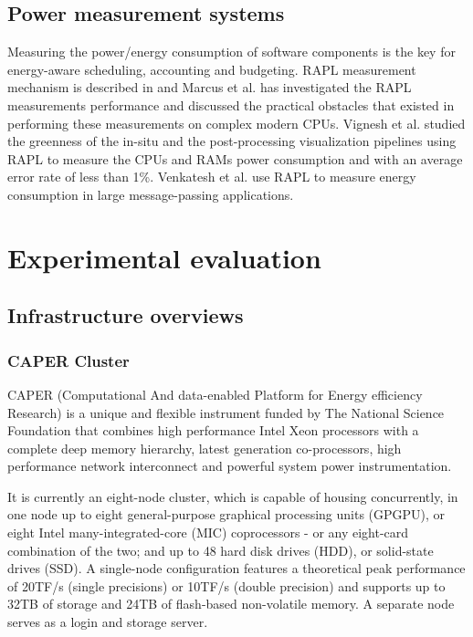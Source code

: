 \documentclass[10pt, conference, compsocconf]{IEEEtran}
\begin{document}
\subsection{Power measurement systems}
Measuring the power/energy consumption of software components is the key for energy-aware scheduling, accounting and budgeting. RAPL measurement mechanism is described in\cite{porterfield2015application} and Marcus et al.\cite{hahnel2012measuring} has investigated the RAPL measurements performance and discussed the practical obstacles that existed in performing these measurements on complex modern CPUs. Vignesh et al.\cite{adhinarayanan2015greenness} studied the greenness of the in-situ and the post-processing visualization pipelines using RAPL to measure the CPUs and RAMs power consumption and with an average error rate of less than 1\%. Venkatesh et al.\cite{venkatesh2013evaluation} use RAPL to measure energy consumption in large message-passing applications.


\section{Experimental evaluation}
\subsection{Infrastructure overviews}
\subsubsection{CAPER Cluster}
CAPER (Computational And data-enabled Platform for Energy efficiency Research) is a unique and flexible instrument funded by The National Science Foundation that combines high performance Intel Xeon processors with a complete deep memory hierarchy, latest generation co-processors, high performance network interconnect and powerful system power instrumentation.

It is currently an eight-node cluster, which is capable of housing concurrently, in one node up to eight general-purpose graphical processing units (GPGPU), or eight Intel many-integrated-core (MIC) coprocessors - or any eight-card combination of the two; and up to 48 hard disk drives (HDD), or solid-state drives (SSD). A single-node configuration features a theoretical peak performance of 20TF/s (single precisions) or 10TF/s (double precision) and supports up to 32TB of storage and 24TB of flash-based non-volatile memory. A separate node serves as a login and storage server.
\end{document}
